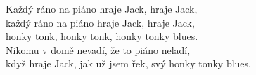 \artist{}
	\nv{}Každý ráno na piáno hraje Jack, hraje Jack,\\
	každý ráno na piáno hraje Jack, hraje Jack,\\
	honky tonk, honky tonk, honky tonky blues.\\
	Nikomu v domě nevadí, že to piáno neladí,\\
	když hraje Jack, jak už jsem řek, svý honky tonky blues.
